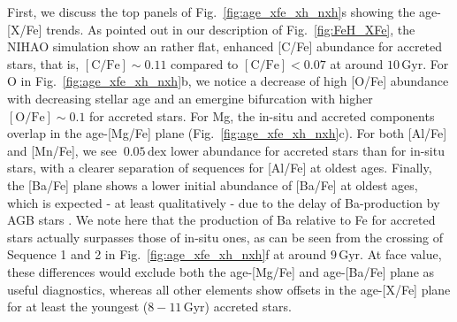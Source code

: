 \documentclass[fleqn,usenatbib]{mnras}
\begin{document}
First, we discuss the top panels of Fig.~\ref{fig:age_xfe_xh_nxh}s showing the age-[X/Fe] trends. As pointed out in our description of Fig.~\ref{fig:FeH_XFe}, the NIHAO simulation show an rather flat, enhanced [C/Fe] abundance for accreted stars, that is, $\mathrm{[C/Fe]} \sim 0.11$ compared to  $\mathrm{[C/Fe]} < 0.07$ at around $10\,\mathrm{Gyr}$. For O in Fig.~\ref{fig:age_xfe_xh_nxh}b, we notice a decrease of high [O/Fe] abundance with decreasing stellar age and an emergine bifurcation with higher $\mathrm{[O/Fe]} \sim 0.1$ for accreted stars. For Mg, the in-situ and accreted components overlap in the age-[Mg/Fe] plane (Fig.~\ref{fig:age_xfe_xh_nxh}c). For both [Al/Fe] and [Mn/Fe], we see $~0.05\,\mathrm{dex}$ lower abundance for accreted stars than for in-situ stars, with a clearer separation of sequences for [Al/Fe] at oldest ages. Finally, the [Ba/Fe] plane shows a lower initial abundance of [Ba/Fe] at oldest ages, which is expected - at least qualitatively - due to the delay of Ba-production by AGB stars \citep{Karakas2016}. We note here that the production of Ba relative to Fe for accreted stars actually surpasses those of in-situ ones, as can be seen from the crossing of Sequence 1 and 2 in Fig.~\ref{fig:age_xfe_xh_nxh}f at around $9\,\mathrm{Gyr}$. At face value, these differences would exclude both the age-[Mg/Fe] and age-[Ba/Fe] plane as useful diagnostics, whereas all other elements show offsets in the age-[X/Fe] plane for at least the youngest ($8-11\,\mathrm{Gyr}$) accreted stars.
\end{document}
